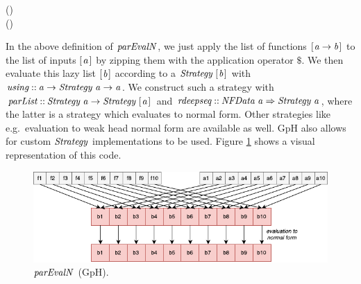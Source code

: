 \documentclass[paper=A4,twoside=true,openright,parskip=full,chapterprefix=true,headings=normal,bibliography=totoc,listof=totoc,titlepage=on,captions=tableabove,draft=false,british]{scrreprt}%
\begin{document}
\begin{hscode}\SaveRestoreHook
{}%
%
%
\>[B]{}\mathbin{::}(\;)\<[E]%
\\
\>[B]{}\;\;\mathrel{=}\;\mathrel{=}\;(\mathbin{\$})\;\;\<[E]%
\\
\>[B]{}\<[18]%
\>[18]{}\;\;\<[E]%
\ColumnHook
\end{hscode}\resethooks
\vspace{-2\baselineskip}

In the above definition of \ensuremath{\Varid{parEvalN}}, we just apply the list of
functions \ensuremath{[\mskip1.5mu \Varid{a}\to \Varid{b}\mskip1.5mu]} to the list of inputs \ensuremath{[\mskip1.5mu \Varid{a}\mskip1.5mu]} by zipping them with
the application operator \ensuremath{\mathbin{\$}}. We then evaluate this lazy list \ensuremath{[\mskip1.5mu \Varid{b}\mskip1.5mu]}
according to a \ensuremath{\Conid{Strategy}\;[\mskip1.5mu \Varid{b}\mskip1.5mu]} with \ensuremath{\Varid{using}\mathbin{::}\Varid{a}\to \Conid{Strategy}\;\Varid{a}\to \Varid{a}}. We
construct such a strategy with \ensuremath{\Varid{parList}\mathbin{::}\Conid{Strategy}\;\Varid{a}\to \Conid{Strategy}\;[\mskip1.5mu \Varid{a}\mskip1.5mu]}
and \ensuremath{\Varid{rdeepseq}\mathbin{::}\Conid{NFData}\;\Varid{a}\Rightarrow \Conid{Strategy}\;\Varid{a}}, where the latter is a strategy
which evaluates to normal form. Other strategies like e.g.~evaluation to
weak head normal form are available as well. GpH also allows for custom
\ensuremath{\Conid{Strategy}} implementations to be used. Figure
\ref{fig:parEvalNMulticoreImg} shows a visual representation of this
code.

\begin{figure}
\centering
\includegraphics{src/img/parEvalNMulticoreImg.pdf}
\caption{\ensuremath{\Varid{parEvalN}} (GpH).\label{fig:parEvalNMulticoreImg}}
\end{figure}
\end{document}
